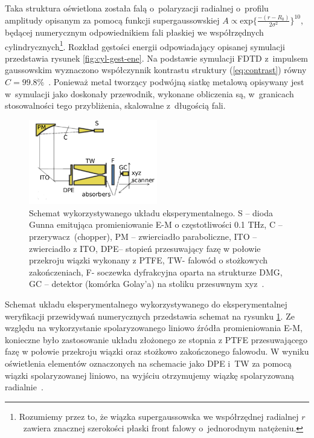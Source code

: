Taka struktura oświetlona została falą o~polaryzacji radialnej o~profilu amplitudy opisanym za pomocą funkcji supergaussowskiej $A \propto \textrm{exp}\{\frac{-(r-R_0)}{2\sigma^2}\}^{10}$, będącej numerycznym odpowiednikiem fali płaskiej we współrzędnych cylindrycznych\footnote{Rozumiemy przez to, że wiązka supergaussowska we współrzędnej radialnej $r$~zawiera znacznej szerokości płaski front falowy o~jednorodnym natężeniu.}. Rozkład gęstości energii odpowiadający opisanej symulacji przedstawia rysunek \ref{fig:cyl-gest-ene}. Na podstawie symulacji FDTD z~impulsem gaussowskim wyznaczono współczynnik kontrastu struktury (\ref{eq:contrast}) równy $C=99.8\%$~\cite{Yavorskiy:14}. Ponieważ metal tworzący podwójną siatkę metalową opisywany jest w~symulacji jako doskonały przewodnik, wykonane obliczenia są, w~granicach stosowalności tego przybliżenia, skalowalne z~długością fali.

\begin{figure}
	\centering
	\includegraphics[width=0.5\textwidth]{images/thz/exp-express-schem.png}
	\caption{Schemat wykorzystywanego układu eksperymentalnego. S – dioda Gunna emitująca promieniowanie E-M o częstotliwości 0.1 THz, C – przerywacz~(chopper), PM – zwierciadło paraboliczne, ITO – zwierciadło z ITO, DPE– stopień przesuwający fazę w połowie przekroju wiązki wykonany z PTFE, TW- falowód o stożkowych zakończeniach, F- soczewka dyfrakcyjna oparta na strukturze DMG, GC – detektor (komórka Golay'a) na stoliku przesuwnym xyz~\cite{Yavorskiy:14}.}
	\label{fig:opt-exp-schem}
\end{figure}

Schemat układu eksperymentalnego wykorzystywanego do eksperymentalnej weryfikacji przewidywań numerycznych przedstawia schemat na rysunku \ref{fig:opt-exp-schem}. Ze względu na wykorzystanie spolaryzowanego liniowo źródła promieniowania E-M, konieczne było zastosowanie układu złożonego ze stopnia z PTFE przesuwającego fazę w połowie przekroju wiązki oraz stożkowo zakończonego falowodu. W wyniku oświetlenia elementów oznaczonych na schemacie jako DPE i~TW za pomocą wiązki spolaryzowanej liniowo, na wyjściu otrzymujemy wiązkę spolaryzowaną radialnie~\cite{grosjean2008linear}.

